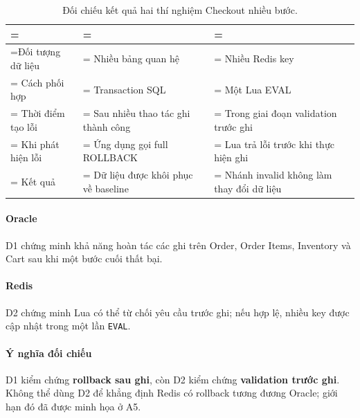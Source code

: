 \begin{table}[!htbp]
\centering
\caption{Đối chiếu kết quả hai thí nghiệm Checkout nhiều bước.}\label{tab:tx-16}
\reporttablesetup
\begin{tabularx}{\linewidth}{|>{\hsize\linewidth=\hsize}L|>{\hsize\linewidth=\hsize}L|>{\hsize\linewidth=\hsize}L|}
\hline
{}
 &  &  \\ \hline
Đối tượng dữ liệu & Nhiều bảng quan hệ & Nhiều Redis key \\ \hline
Cách phối hợp & Transaction SQL & Một Lua EVAL \\ \hline
Thời điểm tạo lỗi & Sau nhiều thao tác ghi thành công & Trong giai đoạn validation trước ghi \\ \hline
Khi phát hiện lỗi & Ứng dụng gọi full ROLLBACK & Lua trả lỗi trước khi thực hiện ghi \\ \hline
Kết quả & Dữ liệu được khôi phục về baseline & Nhánh invalid không làm thay đổi dữ liệu \\ \hline
\end{tabularx}
\end{table}
\paragraph*{Oracle}

D1 chứng minh khả năng hoàn tác các ghi trên Order, Order Items, Inventory và Cart sau khi một bước cuối thất bại.

\paragraph*{Redis}

D2 chứng minh Lua có thể từ chối yêu cầu trước ghi; nếu hợp lệ, nhiều key được cập nhật trong một lần \texttt{EVAL}.

\paragraph*{Ý nghĩa đối chiếu}

D1 kiểm chứng \textbf{rollback sau ghi}, còn D2 kiểm chứng \textbf{validation trước ghi}. Không thể dùng D2 để khẳng định Redis có rollback tương đương Oracle; giới hạn đó đã được minh họa ở A5.

